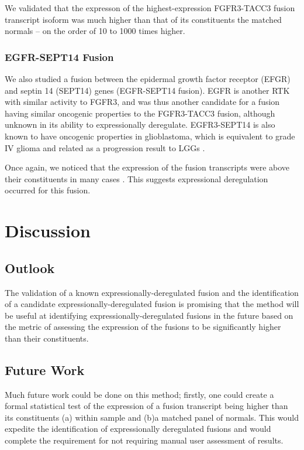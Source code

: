 We validated that the expresson of the highest-expression FGFR3-TACC3 fusion transcript isoform was much higher than that of its constituents the matched normals -- on the order of 10 to 1000 times higher.

\subsubsection{EGFR-SEPT14 Fusion}

We also studied a fusion between the epidermal growth factor receptor (EFGR) and septin 14 (SEPT14) genes (EGFR-SEPT14 fusion). EGFR is another RTK with similar activity to FGFR3, and was thus another candidate for a fusion having similar oncogenic properties to the FGFR3-TACC3 fusion, although unknown in its ability to expressionally deregulate. EGFR3-SEPT14 is also known to have oncogenic properties in glioblastoma, which is equivalent to grade IV glioma and related as a progression result to LGGs .

Once again, we noticed that the expression of the fusion transcripts were above their constituents in many cases . This suggests expressional deregulation occurred for this fusion.

\section{Discussion}

\subsection{Outlook}
The validation of a known expressionally-deregulated fusion and the identification of a candidate expressionally-deregulated fusion is promising that the method will be useful at identifying expressionally-deregulated fusions in the future based on the metric of assessing the expression of the fusions to be significantly higher than their constituents.

\subsection{Future Work}
  
Much future work could be done on this method; firstly, one could create a formal statistical test of the expression of a fusion transcript being higher than its constituents (a) within sample and (b)a matched panel of normals. This would expedite the identification of expressionally deregulated fusions and would complete the requirement for not requiring manual user assessment of results.

